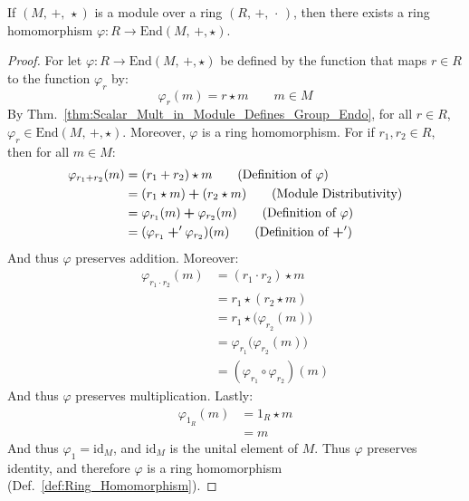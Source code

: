     \begin{theorem}
        If $(M,\,\boldsymbol{+},\,\star)$ is a module over a ring
        $(R,\,+,\,\cdot\,)$, then there exists a ring homomorphism
        $\varphi:R\rightarrow\textrm{End}(M,\,\boldsymbol{+},\star)$.
    \end{theorem}
    \begin{proof}
        For let $\varphi:R\rightarrow\textrm{End}(M,\,\boldsymbol{+},\star)$
        be defined by the function that maps $r\in{R}$ to the function
        $\varphi_{r}$ by:
        \begin{equation}
            \varphi_{r}(m)=r\star{m}
            \quad\quad
            m\in{M}
        \end{equation}
        By Thm.~\ref{thm:Scalar_Mult_in_Module_Defines_Group_Endo},
        for all $r\in{R}$,
        $\varphi_{r}\in\textrm{End}(M,\,\boldsymbol{+},\star)$.
        Moreover, $\varphi$ is a ring homomorphism. For if
        $r_{1},r_{2}\in{R}$, then for all $m\in{M}$:
        \begin{align}
            \varphi_{r_{1}+r_{2}}(m)
            &=(r_{1}+r_{2})\star{m}
            \tag{Definition of $\varphi$}\\
            &=(r_{1}\star{m})\boldsymbol{+}(r_{2}\star{m})
            \tag{Module Distributivity}\\
            &=\varphi_{r_{1}}(m)\boldsymbol{+}\varphi_{r_{2}}(m)
            \tag{Definition of $\varphi$}\\
            &=(\varphi_{r_{1}}\boldsymbol{+}'\varphi_{r_{2}})(m)
            \tag{Definition of $\boldsymbol{+}'$}
        \end{align}
        And thus $\varphi$ preserves addition. Moreover:
        \begin{align}
            \varphi_{r_{1}\cdot{r}_{2}}(m)
            &=(r_{1}\cdot{r}_{2})\star{m}
            \tag{Definition of $\varphi$}\\
            &=r_{1}\star(r_{2}\star{m})
            \tag{Associativity}\\
            &=r_{1}\star\big(\varphi_{r_{2}}(m)\big)
            \tag{Definition of $\varphi$}\\
            &=\varphi_{r_{1}}\big(\varphi_{r_{2}}(m)\big)
            \tag{Definition of $\varphi$}\\
            &=(\varphi_{r_{1}}\circ\varphi_{r_{2}})(m)
            \tag{Definition of $\circ$}
        \end{align}
        And thus $\varphi$ preserves multiplication. Lastly:
        \begin{align}
            \varphi_{1_{R}}(m)&=1_{R}\star{m}
            \tag{Definition of $\varphi$}\\
            &=m
            \tag{Identity}
        \end{align}
        And thus $\varphi_{1}=\textrm{id}_{M}$, and $\textrm{id}_{M}$ is
        the unital element of $M$. Thus $\varphi$ preserves identity,
        and therefore $\varphi$ is a ring homomorphism
        (Def.~\ref{def:Ring_Homomorphism}).
    \end{proof}

